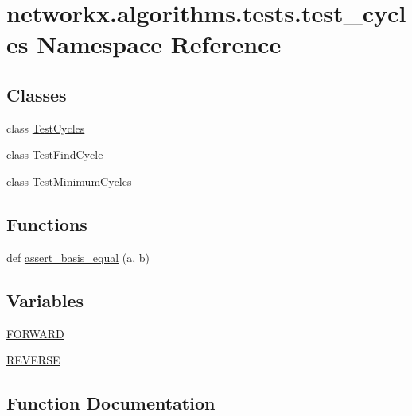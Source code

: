 \hypertarget{namespacenetworkx_1_1algorithms_1_1tests_1_1test__cycles}{}\section{networkx.\+algorithms.\+tests.\+test\+\_\+cycles Namespace Reference}
\label{namespacenetworkx_1_1algorithms_1_1tests_1_1test__cycles}
\subsection*{Classes}
\begin{DoxyCompactItemize}
\item 
class \hyperlink{classnetworkx_1_1algorithms_1_1tests_1_1test__cycles_1_1TestCycles}{Test\+Cycles}
\item 
class \hyperlink{classnetworkx_1_1algorithms_1_1tests_1_1test__cycles_1_1TestFindCycle}{Test\+Find\+Cycle}
\item 
class \hyperlink{classnetworkx_1_1algorithms_1_1tests_1_1test__cycles_1_1TestMinimumCycles}{Test\+Minimum\+Cycles}
\end{DoxyCompactItemize}
\subsection*{Functions}
\begin{DoxyCompactItemize}
\item 
def \hyperlink{namespacenetworkx_1_1algorithms_1_1tests_1_1test__cycles_a9a4bb1a71e4d7b13c64a26ebe99b9e8a}{assert\+\_\+basis\+\_\+equal} (a, b)
\end{DoxyCompactItemize}
\subsection*{Variables}
\begin{DoxyCompactItemize}
\item 
\hyperlink{namespacenetworkx_1_1algorithms_1_1tests_1_1test__cycles_ae721197123405d773ce91a29e0ff6cdf}{F\+O\+R\+W\+A\+RD}
\item 
\hyperlink{namespacenetworkx_1_1algorithms_1_1tests_1_1test__cycles_a44abe65fe0da9f19d5e5fa83c8d2ddff}{R\+E\+V\+E\+R\+SE}
\end{DoxyCompactItemize}


\subsection{Function Documentation}
\mbox{\label{namespacenetworkx_1_1algorithms_1_1tests_1_1test__cycles_a9a4bb1a71e4d7b13c64a26ebe99b9e8a}} 
